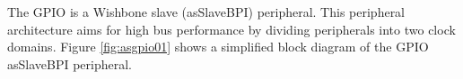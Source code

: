 The GPIO is a Wishbone slave (asSlaveBPI) peripheral. This peripheral architecture aims for high bus performance by dividing peripherals into two clock domains. Figure \ref{fig:asgpio01} shows a simplified block diagram of the GPIO asSlaveBPI peripheral.
